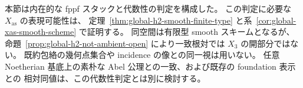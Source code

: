 本節は内在的な fppf スタックと代数性の判定を構成した。
この判定に必要な $X_{\mathrm{as}}$ の表現可能性は、
定理~\ref{thm:global-h2-smooth-finite-type} と系~\ref{cor:global-xas-smooth-scheme} で証明する。
同空間は有限型 smooth スキームとなるが、
命題~\ref{prop:global-h2-not-ambient-open} により一致根対では $X_3$ の開部分ではない。
既約包絡の幾何点集合や incidence の像との同一視は用いない。
任意 Noetherian 基底上の素朴な Abel 公理との一致、および既存の foundation 表示との
相対同値は、この代数性判定とは別に検討する。
